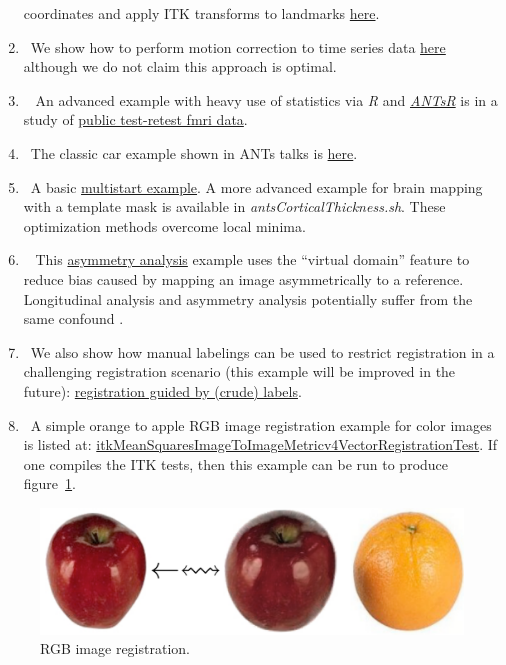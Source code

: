 \documentclass{frontiersSCNS}
\begin{document}
\begin{enumerate}
    coordinates and apply ITK transforms to landmarks
    \href{http://stnava.github.io/chicken/}{here}. %
  \item~We show how to perform motion correction to time series data
    \href{https://github.com/stnava/ANTs/blob/master/Scripts/antsMotionCorrExample}{here}
    although we do not claim this approach is optimal. 
   \item~ An advanced example with heavy use of statistics via {\em
       R} and \href{http://stnava.github.io/ANTsR/}{{\em ANTsR}} is in
     a study of \href{http://stnava.github.io/RfMRI/}{public test-retest fmri data}. %
  \item~The classic car example shown in ANTs talks is \href{http://stnava.github.io/cars/}{here}. %
  \item~A basic \href{http://stnava.github.io/butterfly/}{multistart example}.  A more advanced
    example for brain mapping with a template mask is available in
    {\em antsCorticalThickness.sh}.  These optimization methods
    overcome local minima.
   \item~  This \href{http://stnava.github.io/asymmetry/}{asymmetry
       analysis} example uses the ``virtual domain'' feature to reduce
     bias caused by mapping an image asymmetrically to a reference.
     Longitudinal analysis and asymmetry analysis potentially suffer
     from the same confound \cite{Yushkevich2010a}.
  \item~We also show how manual labelings can be used to restrict
    registration in a challenging registration scenario (this example
    will be improved in the future): \href{http://stnava.github.io/LabelMyHeart/}{
    registration guided by (crude) labels}.  
 \item~A simple orange to apple RGB image registration example for
   color images is listed at:
   \href{https://github.com/Kitware/ITK/blob/master/Modules/Registration/Metricsv4/test/CMakeLists.txt}{itkMeanSquaresImageToImageMetricv4VectorRegistrationTest}.
   If one compiles the ITK tests, then this example can be run to
   produce figure~\ref{fig:appleorange}.
\end{enumerate}

\begin{figure}[t]
\begin{center}
\includegraphics[width=6.5in]{figs/appleorange.pdf}
\caption{\baselineskip 12pt \small RGB image registration.}
\label{fig:appleorange}
\end{center}
\end{figure}
\end{document}
